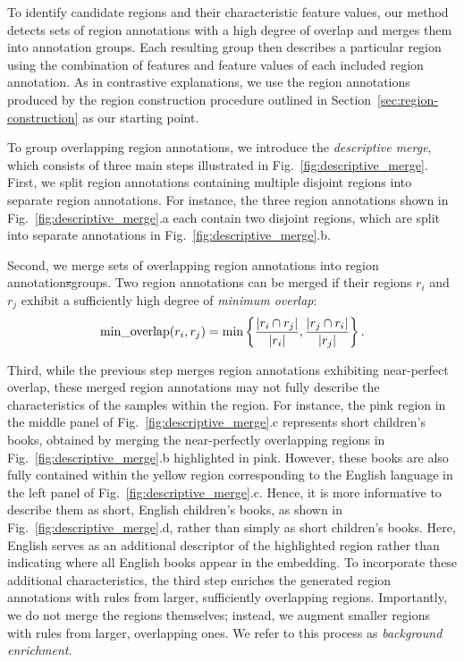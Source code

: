 \documentclass[lettersize,journal]{IEEEtran}
\makeatletter
\providecommand{\DIFdel}[1]{{\protect\color{red}\sout{#1}}} %
\providecommand{\DIFdelbegin}{} %
\providecommand{\DIFdelend}{} %
\providecommand{\DIFscaledelfig}{0.5}
\newlength{\DIFdelgraphicswidth} %
\newlength{\DIFdelgraphicsheight} %
\providecommand{\DIFdelincludegraphics}[2][]{%
\sbox{\DIFdelgraphicsbox}{\DIFOincludegraphics[#1]{#2}}%
\settoboxwidth{\DIFdelgraphicswidth}{\DIFdelgraphicsbox} %
\settoboxtotalheight{\DIFdelgraphicsheight}{\DIFdelgraphicsbox} %
\scalebox{\DIFscaledelfig}{%
\parbox[b]{\DIFdelgraphicswidth}{\usebox{\DIFdelgraphicsbox}\\[-\baselineskip] \rule{\DIFdelgraphicswidth}{0em}}\llap{\resizebox{\DIFdelgraphicswidth}{\DIFdelgraphicsheight}{%
\setlength{\unitlength}{\DIFdelgraphicswidth}%
\begin{picture}(1,1)%
\thicklines\linethickness{2pt} %
{\color[rgb]{1,0,0}\put(0,0){\framebox(1,1){}}}%
{\color[rgb]{1,0,0}\put(0,0){\line( 1,1){1}}}%
{\color[rgb]{1,0,0}\put(0,1){\line(1,-1){1}}}%
\end{picture}%
}\hspace*{3pt}}} %
} %
\DeclareRobustCommand{\DIFdelbegin}{\DIFOdelbegin \let\includegraphics\DIFdelincludegraphics} %
\DeclareRobustCommand{\DIFdelend}{\DIFOaddend \let\includegraphics\DIFOincludegraphics} %
\let\sout@orig\sout %
\renewcommand{\sout}[1]{\ifmmode\text{\sout@orig{\ensuremath{#1}}}\else\sout@orig{#1}\fi} %
\makeatother
\begin{document}
To identify candidate regions and their characteristic feature values, our method detects sets of region annotations with a high degree of overlap and merges them into annotation groups. Each resulting group then describes a particular region using the combination of features and feature values of each included region annotation.
As in contrastive explanations, we use the region annotations produced by the region construction procedure outlined in Section~\ref{sec:region-construction} as our starting point.

To group overlapping region annotations, we introduce the \textit{descriptive merge}, which consists of three main steps illustrated in Fig.~\ref{fig:descriptive_merge}. First, we split region annotations containing multiple disjoint regions into separate region annotations. For instance, the three region annotations shown in Fig.~\ref{fig:descriptive_merge}.a each contain two disjoint regions, which are split into separate annotations in Fig.~\ref{fig:descriptive_merge}.b.

Second, we merge sets of overlapping region annotations into region annotation\DIFdelbegin \DIFdel{s}\DIFdelend  groups.
Two region annotations can be merged if their regions $r_i$ and $r_j$ exhibit a sufficiently high degree of \textit{minimum overlap}:
\begin{equation}
\text{min\_overlap}(r_i, r_j) = \min \left \{ \frac{|r_i \cap r_j|}{|r_i|}, \frac{|r_j \cap r_i|}{|r_j|} \right \}. \notag
\end{equation}

Third, while the previous step merges region annotations exhibiting near-perfect overlap, these merged region annotations may not fully describe the characteristics of the samples within the region. For instance, the pink region in the middle panel of Fig.~\ref{fig:descriptive_merge}.c represents short children's books, obtained by merging the near-perfectly overlapping regions in Fig.~\ref{fig:descriptive_merge}.b highlighted in pink. However, these books are also fully contained within the yellow region corresponding to the English language in the left panel of Fig.~\ref{fig:descriptive_merge}.c. Hence, it is more informative to describe them as short, English children's books, as shown in Fig.~\ref{fig:descriptive_merge}.d, rather than simply as short children's books.
Here, English serves as an additional descriptor of the highlighted region rather than indicating where all English books appear in the embedding.
To incorporate these additional characteristics, the third step enriches the generated region annotations with rules from larger, sufficiently overlapping regions.
Importantly, we do not merge the regions themselves; instead, we augment smaller regions with rules from larger, overlapping ones.
We refer to this process as \textit{background enrichment}.
\end{document}
